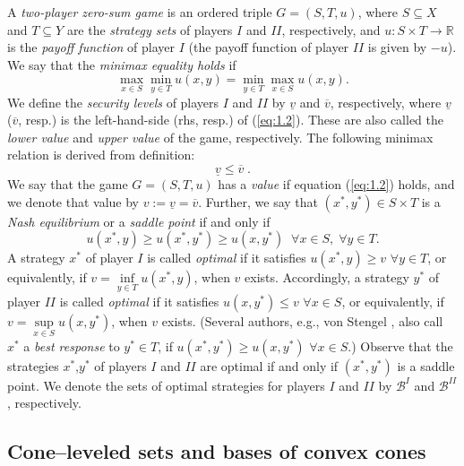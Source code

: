 \documentclass[11pt, twoside]{article}
\numberwithin{equation}{section}
\theoremstyle{definition}
\begin{document}
 A \textit{two-player zero-sum game} is an ordered triple $G=(S, T,u)$, where $S\subseteq X$ and $T\subseteq Y$ are the \textit{strategy sets} of players $I$ and $II$, respectively, and $u:S\times T\rightarrow \mathbb{R}$ is the \textit{payoff function} of player $I$ (the payoff function of player $II$ is given by $-u$). We say that the \textit{minimax equality holds} if
\begin{equation}\label{eq:2.4}
    \max_{x\in S}\min_{y\in T}u(x,y)=\min_{y\in T}\max_{x\in S}u(x,y).
\end{equation}
 We define the \textit{security levels} of players $I$ and $II$ by $\underline{v}$ and $\overline{v}$, respectively, where $\underline{v}$ ($\overline{v}$, resp.) is the left-hand-side (rhs, resp.) of (\ref{eq:1.2}). These are also called the \textit{lower value} and \textit{upper value} of the game, respectively. The following minimax relation is derived from definition:
\begin{equation}\label{eq:2.5}
    \underline{v}\leq\overline{v}\;.
\end{equation}
  We say that the game $G=(S,T,u)$ has a \textit{value} if equation (\ref{eq:1.2}) holds, and we denote that value by $v:=  \underline{v}=\overline{v}$. Further, we say that $(x^*,y^*)\in S\times T$ is a \textit{Nash equilibrium} or a \textit{saddle point} if and only if
\begin{equation}\label{eq:2.6}
    u(x^*,y)\geq u(x^*,y^*)\geq u(x,y^*)\;\;\forall x\in S,\;\forall y\in T.
\end{equation}
 A strategy $x^*$ of player $I$ is called \textit{optimal} if it satisfies $u(x^*,y)\geq v$ $\forall y\in T$, or equivalently, if $v=\inf\limits_{y\in T}u(x^*,y)$, when $v$ exists. Accordingly, a strategy $y^*$ of player $II$ is called \textit{optimal} if it satisfies $u(x,y^*)\leq v$ $\forall x\in S$, or equivalently, if 
 \;$v=\sup\limits_{x\in S}u(x,y^*)$, when $v$ exists. (Several authors, e.g., von Stengel \cite{von2002computing}, also call $x^*$ a \textit{best response} to $y^*\in T$, if $u(x^*,y^*)\geq u(x,y^*)$ $\forall x\in S$.) Observe that the strategies $x^*$,\;$y^*$ of players $I$ and $II$ are optimal if and only if $(x^*,y^*)$ is a saddle point. We denote the sets of optimal strategies for players $I$ and $II$ by $\mathcal{B}^{I}$ and $\mathcal{B}^{II}$, respectively.

\vspace{-0.1cm}\subsection{Cone--leveled sets and bases of convex cones}\vspace{-0.2cm}
\end{document}
